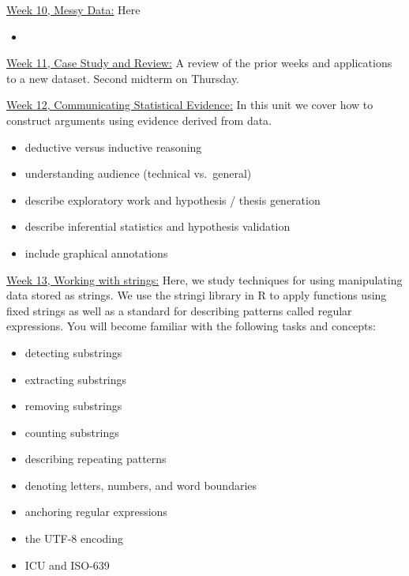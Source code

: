 \documentclass[12pt]{article}
\begin{document}
\bigskip

\underline{Week 10, Messy Data:}
Here
\begin{itemize}\setlength\itemsep{0em}
\item

\end{itemize}

\bigskip

\underline{Week 11, Case Study and Review:}
A review of the prior weeks and applications to a
new dataset. Second midterm on Thursday.

\bigskip

\underline{Week 12, Communicating Statistical Evidence:}
In this unit we cover how to construct arguments using evidence derived
from data.
\begin{itemize}\setlength\itemsep{0em}
\item
  deductive versus inductive reasoning
\item
  understanding audience (technical vs.~general)
\item
  describe exploratory work and hypothesis / thesis generation
\item
  describe inferential statistics and hypothesis validation
\item
  include graphical annotations
\end{itemize}

\bigskip

\underline{Week 13, Working with strings:}
Here, we study techniques for using manipulating data stored as strings. We use the stringi library in R to apply functions using fixed strings as well as a standard for describing patterns called regular expressions. You will become familiar with the following tasks and concepts:
\begin{itemize}\setlength\itemsep{0em}
\item detecting substrings
\item extracting substrings
\item removing substrings
\item counting substrings
\item describing repeating patterns
\item denoting letters, numbers, and word boundaries
\item anchoring regular expressions
\item the UTF-8 encoding
\item ICU and ISO-639
\end{itemize}
\end{document}
